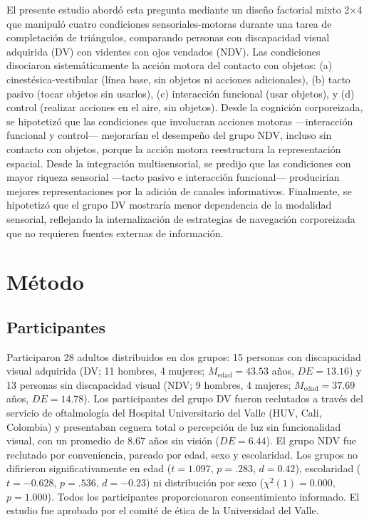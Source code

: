 \documentclass[12pt,letterpaper]{article}
\begin{document}
El presente estudio abordó esta pregunta mediante un diseño factorial mixto 2$\times$4 que manipuló cuatro condiciones sensoriales-motoras durante una tarea de completación de triángulos, comparando personas con discapacidad visual adquirida (DV) con videntes con ojos vendados (NDV). Las condiciones disociaron sistemáticamente la acción motora del contacto con objetos: (a) cinestésica-vestibular (línea base, sin objetos ni acciones adicionales), (b) tacto pasivo (tocar objetos sin usarlos), (c) interacción funcional (usar objetos), y (d) control (realizar acciones en el aire, sin objetos). Desde la cognición corporeizada, se hipotetizó que las condiciones que involucran acciones motoras ---interacción funcional y control--- mejorarían el desempeño del grupo NDV, incluso sin contacto con objetos, porque la acción motora reestructura la representación espacial. Desde la integración multisensorial, se predijo que las condiciones con mayor riqueza sensorial ---tacto pasivo e interacción funcional--- producirían mejores representaciones por la adición de canales informativos. Finalmente, se hipotetizó que el grupo DV mostraría menor dependencia de la modalidad sensorial, reflejando la internalización de estrategias de navegación corporeizada que no requieren fuentes externas de información.

\section{Método}

\subsection{Participantes}

Participaron 28 adultos distribuidos en dos grupos: 15 personas con discapacidad visual adquirida (DV; 11 hombres, 4 mujeres; $M_{\text{edad}} = 43.53$ años, $DE = 13.16$) y 13 personas sin discapacidad visual (NDV; 9 hombres, 4 mujeres; $M_{\text{edad}} = 37.69$ años, $DE = 14.78$). Los participantes del grupo DV fueron reclutados a través del servicio de oftalmología del Hospital Universitario del Valle (HUV, Cali, Colombia) y presentaban ceguera total o percepción de luz sin funcionalidad visual, con un promedio de $8.67$ años sin visión ($DE = 6.44$). El grupo NDV fue reclutado por conveniencia, pareado por edad, sexo y escolaridad. Los grupos no difirieron significativamente en edad ($t = 1.097$, $p = .283$, $d = 0.42$), escolaridad ($t = -0.628$, $p = .536$, $d = -0.23$) ni distribución por sexo ($\chi^2(1) = 0.000$, $p = 1.000$). Todos los participantes proporcionaron consentimiento informado. El estudio fue aprobado por el comité de ética de la Universidad del Valle.
\end{document}
